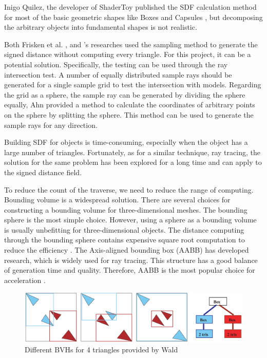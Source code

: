 Inigo Quilez, the developer of ShaderToy \cite{shadertoy} published the SDF calculation method for most of the basic geometric shapes like Boxes and Capsules \cite{IQSDF}, but decomposing the arbitrary objects into fundamental shapes is not realistic.

\hspace*{\fill}

Both Frisken et al. \cite{frisken2000sample}, and \cite{Ju2004sample}'s researches used the sampling method to generate the signed distance without computing every triangle. For this project, it can be a potential solution. Specifically, the testing can be used through the ray intersection test. A number of equally distributed sample rays should be generated for a single sample grid to test the intersection with models. Regarding the grid as a sphere, the sample ray can be generated by dividing the sphere equally, Ahn \cite{glsphere} provided a method to calculate the coordinates of arbitrary points on the sphere by splitting the sphere. This method can be used to generate the sample rays for any direction.

\hspace*{\fill}

Building SDF for objects is time-consuming, especially when the object has a large number of triangles. Fortunately, as for a similar technique, ray tracing, the solution for the same problem has been explored for a long time and can apply to the signed distance field.

\hspace*{\fill}

To reduce the count of the traverse, we need to reduce the range of computing. Bounding volume is a widespread solution. There are several choices for constructing a bounding volume for three-dimensional meshes. The bounding sphere is the most simple choice. However, using a sphere as a bounding volume is usually unbefitting for three-dimensional objects. The distance computing through the bounding sphere contains expensive square root computation to reduce the efficiency \cite{Sanchez2012EfficientEO}. The Axis-aligned bounding box (AABB) has developed research, which is widely used for ray tracing\cite{Havran2000HeuristicRS}. This structure has a good balance of generation time and quality. Therefore, AABB is the most popular choice for acceleration \cite{Sanchez2012EfficientEO}.

 \begin{figure}[htbp]
    \centering
    \includegraphics[width=16cm]{Images/Chap2/BVH.png}
    \caption{Different BVHs for 4 triangles provided by Wald \cite{bvhraytracing}}
    \label{br:bvh}
 \end{figure}

